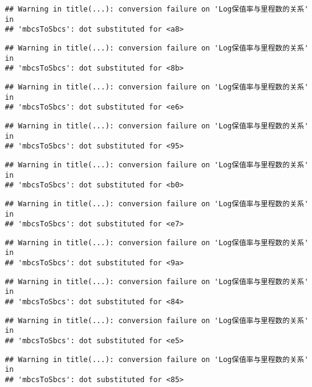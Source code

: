 \documentclass[]{article}
\begin{document}
\begin{verbatim}
## Warning in title(...): conversion failure on 'Log保值率与里程数的关系' in
## 'mbcsToSbcs': dot substituted for <a8>
\end{verbatim}

\begin{verbatim}
## Warning in title(...): conversion failure on 'Log保值率与里程数的关系' in
## 'mbcsToSbcs': dot substituted for <8b>
\end{verbatim}

\begin{verbatim}
## Warning in title(...): conversion failure on 'Log保值率与里程数的关系' in
## 'mbcsToSbcs': dot substituted for <e6>
\end{verbatim}

\begin{verbatim}
## Warning in title(...): conversion failure on 'Log保值率与里程数的关系' in
## 'mbcsToSbcs': dot substituted for <95>
\end{verbatim}

\begin{verbatim}
## Warning in title(...): conversion failure on 'Log保值率与里程数的关系' in
## 'mbcsToSbcs': dot substituted for <b0>
\end{verbatim}

\begin{verbatim}
## Warning in title(...): conversion failure on 'Log保值率与里程数的关系' in
## 'mbcsToSbcs': dot substituted for <e7>
\end{verbatim}

\begin{verbatim}
## Warning in title(...): conversion failure on 'Log保值率与里程数的关系' in
## 'mbcsToSbcs': dot substituted for <9a>
\end{verbatim}

\begin{verbatim}
## Warning in title(...): conversion failure on 'Log保值率与里程数的关系' in
## 'mbcsToSbcs': dot substituted for <84>
\end{verbatim}

\begin{verbatim}
## Warning in title(...): conversion failure on 'Log保值率与里程数的关系' in
## 'mbcsToSbcs': dot substituted for <e5>
\end{verbatim}

\begin{verbatim}
## Warning in title(...): conversion failure on 'Log保值率与里程数的关系' in
## 'mbcsToSbcs': dot substituted for <85>
\end{verbatim}
\end{document}
